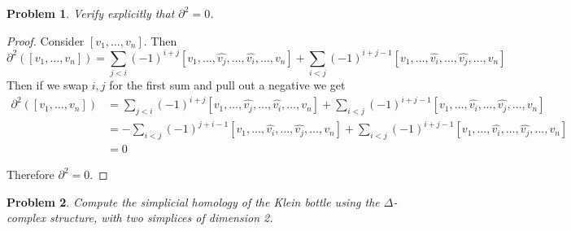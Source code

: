 \documentclass[10pt]{article}
\newcommand{\sk}{\vskip 10mm}
\theoremstyle{plain}
\newtheorem{problem}{Problem}
\theoremstyle{remark}
\begin{document}
\begin{problem}
  Verify explicitly that $\partial^2=0$.
\end{problem}

\begin{proof}
  Consider $[v_1,\ldots,v_n]$. Then
  \[ \partial^2([v_1,\ldots,v_n])=
    \sum_{j<i}(-1)^{i+j}[v_1,\ldots,\hat{v_j},\ldots,\hat{v_i},\ldots, v_n]
    + \sum_{i<j}(-1)^{i+j-1}[v_1,\ldots,\hat{v_i},\ldots,\hat{v_j},\ldots,v_n]\]
  Then if we swap $i,j$ for the first sum and pull out a negative we get
  \begin{align*}
    \partial^2([v_1,\ldots,v_n]) &=\sum_{j<i}(-1)^{i+j}[v_1,\ldots,\hat{v_j},\ldots,\hat{v_i},\ldots, v_n]
                          + \sum_{i<j}(-1)^{i+j-1}[v_1,\ldots,\hat{v_i},\ldots,\hat{v_j},\ldots,v_n]\\
                        & = -\sum_{i<j}(-1)^{j+i-1}[v_1,\ldots,\hat{v_i},\ldots,\hat{v_j},\ldots, v_n]
                          + \sum_{i<j}(-1)^{i+j-1}[v_1,\ldots,\hat{v_i},\ldots,\hat{v_j},\ldots,v_n]\\
                        &= 0
  \end{align*}

  Therefore $\partial^2= 0$.
\end{proof}

\sk

\begin{problem}
  Compute the simplicial homology of the Klein bottle using the
  $\Delta$-complex structure, with two simplices of dimension 2.
\end{problem}
\end{document}
